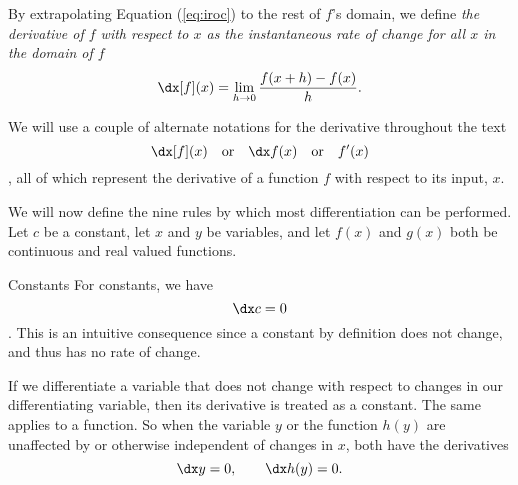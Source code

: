 By extrapolating Equation (\ref{eq:iroc}) to the rest of $f$'s domain, we define \emph{the derivative of $f$ with respect to $x$ as the
instantaneous rate of change for all $x$ in the domain of $f$}
\begin{equation}\label{eq:derivative}
    \dx[f] (x) = \lim_{h\rightarrow 0} \frac{f(x + h) - f(x)}{h} .
\end{equation}

We will use a couple of alternate notations for the derivative
throughout the text
\begin{equation*}
    \dx[f](x) \quad \text{or} \quad \dx f(x) \quad \text{or} \quad f'(x)
\end{equation*}, all of which represent the derivative of a function $f$ with respect to its input, $x$.



We will now define the nine rules by which most differentiation can be performed. Let $c$ be a constant, let $x$ and $y$ be variables, and let $f(x)$ and $g(x)$ both be continuous and real valued functions.

\begin{psec}{Constants}\label{rule:derivative constants} For constants,
    we have
    \begin{equation}\label{eq:derivative constant}
        \dx c = 0
    \end{equation}
    . This is an intuitive consequence since a constant by definition does not
    change, and thus has no rate of change.

    If we differentiate a variable that does not change with respect to changes in our differentiating variable, then its derivative is treated as a constant. The same applies to a function. So when the variable $y$ or the function $h(y)$ are unaffected by or otherwise independent of changes in $x$, both have the derivatives
    \begin{equation*}
        \dx y = 0, \quad \quad \dx h(y) = 0.
    \end{equation*}

\end{psec}

